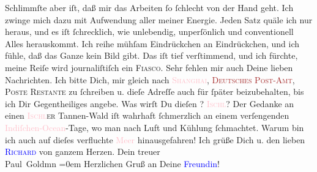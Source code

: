                Schlimmſte aber iſt, daß mir das Arbeiten ſo ſchlecht von der Hand geht. Ich zwinge
               mich dazu mit Aufwendung aller meiner Energie. {\pb}Jeden Satz quäle ich nur heraus, und es iſt ſchrecklich, wie unlebendig,
               unperſönlich und conventionell Alles herauskommt. Ich reihe mühſam Eindrückchen an
               Eindrückchen, und ich fühle, daß das Ganze kein Bild gibt. Das iſt tief verſtimmend,
               und ich fürchte, meine Reiſe wird journaliſtiſch ein \textsc{Fiasco}.\pend
           \pstart
           Sehr fehlen mir auch Deine lieben Nachrichten. Ich bitte Dich, mir gleich {\pb}nach \textsc{\textcolor{pink}{Shanghai}{}\ledrightnote{\textcolor{pink}{Shanghai}}}, \textsc{\textcolor{brown}{Deutsches Post-Amt}{}, Poste
                  Restante} zu ſchreiben u. dieſe Adreſſe auch für ſpäter beizubehalten, bis ich
               Dir Gegentheiliges angebe.\pend
           \pstart
           Was wirſt Du dieſen \label{K_L02846-1v}\label{K_L02846-1h}? \textsc{\textcolor{pink}{Ischl}{}\ledrightnote{\textcolor{pink}{Bad Ischl}}}? Der Gedanke an einen \textsc{\textcolor{pink}{Ischl}{}\ledrightnote{\textcolor{pink}{Bad Ischl}}er} Tannen-Wald  iſt {\pb}wahrhaft ſchmerzlich an einem verſengenden
                  \textcolor{pink}{Indiſchen-Ocean}{}\ledrightnote{\textcolor{pink}{Indischer Ozean}}-Tage, wo man nach Luft und
               Kühlung ſchmachtet. Warum bin ich auch auf dieſes verfluchte \textcolor{pink}{Meer}{} hinausgefahren!\pend
           \pstart
           Ich grüße Dich u. den lieben \textsc{\textcolor{blue}{Richard}{}\ledrightnote{\textcolor{blue}{Richard Beer-Hofmann}}} von ganzem Herzen.\pend
           \pstart
           Dein treuer {\\[\baselineskip]}\spacefill\mbox{Paul Goldmn}\pend
           \leftskip=0em{}\pstart
           \noindent{}Herzlichen Gruß an Deine \textcolor{blue}{Freundin}{}!\pend
           \endnumbering{}  
      
